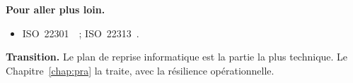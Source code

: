 \bigskip

\begin{boxinfo}
\textbf{Pour aller plus loin.}
\begin{itemize}
    \item ISO~22301~\cite{iso22301_2019}~; ISO~22313~\cite{iso22313_2020}.
\end{itemize}
\end{boxinfo}

\begin{boxinfo}
\textbf{Transition.} Le plan de reprise informatique est la partie la plus
technique. Le Chapitre~\ref{chap:pra} la traite, avec la résilience
opérationnelle.
\end{boxinfo}
